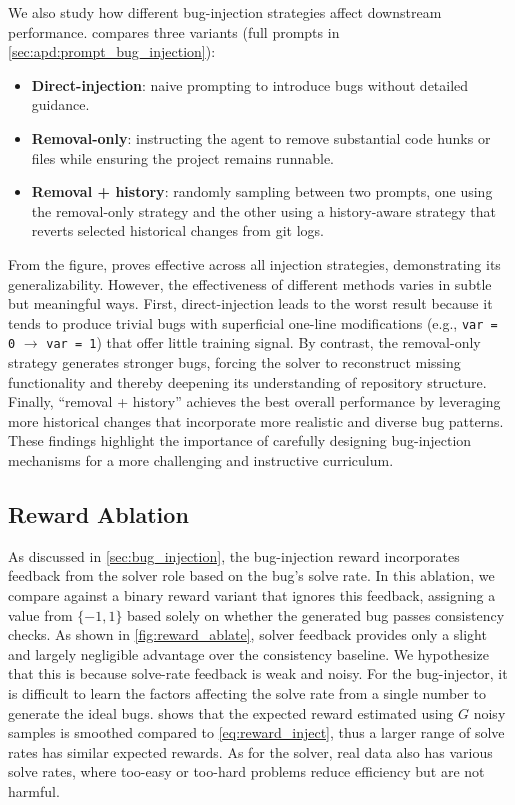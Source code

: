 We also study how different bug-injection strategies affect downstream performance.  compares three variants (full prompts in \cref{sec:apd:prompt_bug_injection}):
\begin{itemize}
\item \textbf{Direct-injection}: naive prompting to introduce bugs without detailed guidance.
\item \textbf{Removal-only}: instructing the agent to remove substantial code hunks or files while ensuring the project remains runnable.
\item \textbf{Removal + history}: randomly sampling between two prompts, one using the removal-only strategy and the other using a history-aware strategy that reverts selected historical changes from git logs.
\end{itemize}

From the figure, \tech proves effective across all injection strategies, demonstrating its generalizability. However, the effectiveness of different methods varies in subtle but meaningful ways.
First, direct-injection leads to the worst result because it tends to produce trivial bugs with superficial one-line modifications (e.g., \texttt{var = 0} $\to$ \texttt{var = 1}) that offer little training signal.
By contrast, the removal-only strategy generates stronger bugs, forcing the solver to reconstruct missing functionality and thereby deepening its understanding of repository structure.
Finally, ``removal + history'' achieves the best overall performance by leveraging more historical changes that incorporate more realistic and diverse bug patterns.
These findings highlight the importance of carefully designing bug-injection mechanisms for a more challenging and instructive curriculum.


\subsection{Reward Ablation}
As discussed in \cref{sec:bug_injection}, the bug-injection reward incorporates feedback from the solver role based on the bug's solve rate. In this ablation, we compare against a binary reward variant that ignores this feedback, assigning a value from $\{-1, 1\}$ based solely on whether the generated bug passes consistency checks.
As shown in \cref{fig:reward_ablate}, solver feedback provides only a slight and largely negligible advantage over the consistency baseline. We hypothesize that this is because solve-rate feedback is weak and noisy. 
For the bug-injector, it is difficult to learn the factors affecting the solve rate from a single number to generate the ideal bugs.
 shows that the expected reward estimated using $G$ noisy samples is smoothed compared to \cref{eq:reward_inject}, thus a larger range of solve rates has similar expected rewards.
As for the solver, real data also has various solve rates, where too-easy or too-hard problems reduce efficiency but are not harmful.

